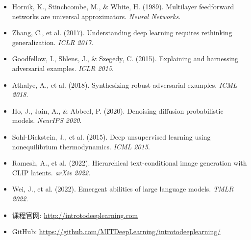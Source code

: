 \documentclass[a4paper]{article}
\begin{document}
\begin{itemize}
    \item Hornik, K., Stinchcombe, M., \& White, H. (1989). Multilayer feedforward networks are universal approximators. \textit{Neural Networks}.
    \item Zhang, C., et al. (2017). Understanding deep learning requires rethinking generalization. \textit{ICLR 2017}.
    \item Goodfellow, I., Shlens, J., \& Szegedy, C. (2015). Explaining and harnessing adversarial examples. \textit{ICLR 2015}.
    \item Athalye, A., et al. (2018). Synthesizing robust adversarial examples. \textit{ICML 2018}.
    \item Ho, J., Jain, A., \& Abbeel, P. (2020). Denoising diffusion probabilistic models. \textit{NeurIPS 2020}.
    \item Sohl-Dickstein, J., et al. (2015). Deep unsupervised learning using nonequilibrium thermodynamics. \textit{ICML 2015}.
    \item Ramesh, A., et al. (2022). Hierarchical text-conditional image generation with CLIP latents. \textit{arXiv 2022}.
    \item Wei, J., et al. (2022). Emergent abilities of large language models. \textit{TMLR 2022}.
    \item 课程官网: \url{http://introtodeeplearning.com}
    \item GitHub: \url{https://github.com/MITDeepLearning/introtodeeplearning/}
\end{itemize}

\end{document}
